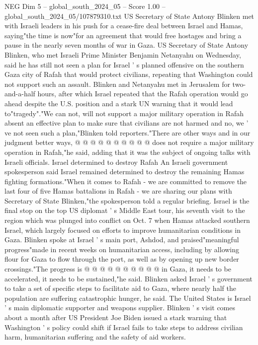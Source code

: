 \begin{textsample}{NEG Dim 5 – global\_south\_2024\_05 – Score 1.00 – global\_south\_2024\_05/107879310.txt}  \label{ex:f5_neg_329}
US Secretary of State Antony Blinken met with Israeli leaders in his push for a cease-fire deal between Israel and Hamas, saying"the time is now"for an agreement that would free hostages and bring a pause in the nearly seven months of war in Gaza.
US Secretary of State Antony Blinken, who met Israeli Prime Minister Benjamin Netanyahu on Wednesday, said he has still not seen a plan for Israel ' s planned offensive on the southern Gaza city of Rafah that would protect civilians, repeating that Washington could not support such an assault.
Blinken and Netanyahu met in Jerusalem for two-and-a-half hours, after which Israel repeated that the Rafah operation would go ahead despite the U.S. position and a stark UN warning that it would lead to"tragedy"."We can not, will not support a major military operation in Rafah absent an effective plan to make sure that civilians are not harmed and no, we ' ve not seen such a plan,"Blinken told reporters."There are other ways and in our judgment better ways, @ @ @ @ @ @ @ @ @ @ does not require a major military operation in Rafah,"he said, adding that it was the subject of ongoing talks with Israeli officials.
Israel determined to destroy Rafah An Israeli government spokesperson said Israel remained determined to destroy the remaining Hamas fighting formations."When it comes to Rafah - we are committed to remove the last four of five Hamas battalions in Rafah - we are sharing our plans with Secretary of State Blinken,"the spokesperson told a regular briefing.
Israel is the final stop on the top US diplomat ' s Middle East tour, his seventh visit to the region which was plunged into conflict on Oct. 7 when Hamas attacked southern Israel, which largely focused on efforts to improve humanitarian conditions in Gaza.
Blinken spoke at Israel ' s main port, Ashdod, and praised"meaningful progress"made in recent weeks on humanitarian access, including by allowing flour for Gaza to flow through the port, as well as by opening up new border crossings."The progress is @ @ @ @ @ @ @ @ @ @ in Gaza, it needs to be accelerated, it needs to be sustained,"he said.
Blinken asked Israel ' s government to take a set of specific steps to facilitate aid to Gaza, where nearly half the population are suffering catastrophic hunger, he said.
The United States is Israel ' s main diplomatic supporter and weapons supplier.
Blinken ' s visit comes about a month after US President Joe Biden issued a stark warning that Washington ' s policy could shift if Israel fails to take steps to address civilian harm, humanitarian suffering and the safety of aid workers.

\end{textsample}
